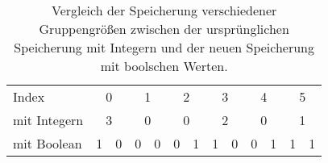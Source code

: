 \begin{table}[H]
\begin{tabular}{l|cc|cc|cc|cc|cc|cc}
Index              & \multicolumn{2}{c|}{0} & \multicolumn{2}{c|}{1} & \multicolumn{2}{c|}{2} & \multicolumn{2}{c|}{3} & \multicolumn{2}{c|}{4} & \multicolumn{2}{c}{5} \\
\gsize mit Integern & \multicolumn{2}{c|}{3} & \multicolumn{2}{c|}{0} & \multicolumn{2}{c|}{0} & \multicolumn{2}{c|}{2} & \multicolumn{2}{c|}{0} & \multicolumn{2}{c}{1} \\
\gsize mit Boolean  & 1          & 0         & 0          & 0         & 0          & 1         & 1          & 0         & 0          & 1         & 1         & 1        
\end{tabular}
\caption{Vergleich der Speicherung verschiedener Gruppengrößen zwischen der ursprünglichen Speicherung mit Integern und der neuen Speicherung mit boolschen Werten.}
\label{compare_gsize_variants}
\end{table}